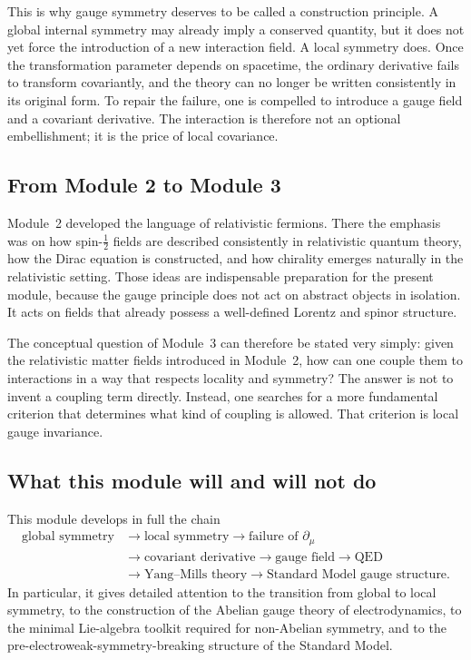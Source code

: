 \documentclass[11pt,a4paper]{article}
\newcommand{\half}{\tfrac12}
\begin{document}
This is why gauge symmetry deserves to be called a construction principle. A global internal symmetry may already imply a conserved quantity, but it does not yet force the introduction of a new interaction field. A local symmetry does. Once the transformation parameter depends on spacetime, the ordinary derivative fails to transform covariantly, and the theory can no longer be written consistently in its original form. To repair the failure, one is compelled to introduce a gauge field and a covariant derivative. The interaction is therefore not an optional embellishment; it is the price of local covariance.



\subsection{From Module 2 to Module 3}

Module~2 developed the language of relativistic fermions. There the emphasis was on how spin-\(\half\) fields are described consistently in relativistic quantum theory, how the Dirac equation is constructed, and how chirality emerges naturally in the relativistic setting. Those ideas are indispensable preparation for the present module, because the gauge principle does not act on abstract objects in isolation. It acts on fields that already possess a well-defined Lorentz and spinor structure.

The conceptual question of Module~3 can therefore be stated very simply: given the relativistic matter fields introduced in Module~2, how can one couple them to interactions in a way that respects locality and symmetry? The answer is not to invent a coupling term directly. Instead, one searches for a more fundamental criterion that determines what kind of coupling is allowed. That criterion is local gauge invariance.




\subsection{What this module will and will not do}

This module develops in full the chain
\[
\begin{aligned}
\text{global symmetry}
&\longrightarrow \text{local symmetry}
\longrightarrow \text{failure of } \partial_\mu \\
&\longrightarrow \text{covariant derivative}
\longrightarrow \text{gauge field}
\longrightarrow \text{QED} \\
&\longrightarrow \text{Yang--Mills theory}
\longrightarrow \text{Standard Model gauge structure}.
\end{aligned}
\]
In particular, it gives detailed attention to the transition from global to local symmetry, to the construction of the Abelian gauge theory of electrodynamics, to the minimal Lie-algebra toolkit required for non-Abelian symmetry, and to the pre-electroweak-symmetry-breaking structure of the Standard Model.
\end{document}
